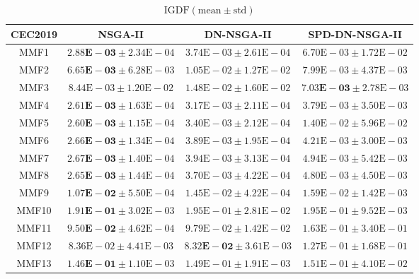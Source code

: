 \begin{table}[htbp]
	\scriptsize
	\centering
	\caption{$\text{IGDF} (\text{mean} \pm \text{std})$}\label{tab: IGDF}
	\begin{tabular}{cccc}
		\toprule
		CEC2019 & NSGA-II & DN-NSGA-II & SPD-DN-NSGA-II \\
		\midrule
		MMF1 & $\mathbf{2.88\text{E}-03} \pm 2.34\text{E}-04$ & $3.74\text{E}-03 \pm 2.61\text{E}-04$ & $6.70\text{E}-03 \pm 1.72\text{E}-02$\\
		MMF2 & $\mathbf{6.65\text{E}-03} \pm 6.28\text{E}-03$ & $1.05\text{E}-02 \pm 1.27\text{E}-02$ & $7.99\text{E}-03 \pm 4.37\text{E}-03$\\
		MMF3 & $8.44\text{E}-03 \pm 1.20\text{E}-02$ & $1.48\text{E}-02 \pm 1.60\text{E}-02$ & $\mathbf{7.03\text{E}-03} \pm 2.78\text{E}-03$\\
		MMF4 & $\mathbf{2.61\text{E}-03} \pm 1.63\text{E}-04$ & $3.17\text{E}-03 \pm 2.11\text{E}-04$ & $3.79\text{E}-03 \pm 3.50\text{E}-03$\\
		MMF5 & $\mathbf{2.60\text{E}-03} \pm 1.15\text{E}-04$ & $3.40\text{E}-03 \pm 2.12\text{E}-04$ & $1.40\text{E}-02 \pm 5.96\text{E}-02$\\
		MMF6 & $\mathbf{2.66\text{E}-03} \pm 1.34\text{E}-04$ & $3.89\text{E}-03 \pm 1.95\text{E}-04$ & $4.21\text{E}-03 \pm 3.00\text{E}-03$\\
		MMF7 & $\mathbf{2.67\text{E}-03} \pm 1.40\text{E}-04$ & $3.94\text{E}-03 \pm 3.13\text{E}-04$ & $4.94\text{E}-03 \pm 5.42\text{E}-03$\\
		MMF8 & $\mathbf{2.65\text{E}-03} \pm 1.44\text{E}-04$ & $3.70\text{E}-03 \pm 4.22\text{E}-04$ & $4.80\text{E}-03 \pm 4.50\text{E}-03$\\
		MMF9 & $\mathbf{1.07\text{E}-02} \pm 5.50\text{E}-04$ & $1.45\text{E}-02 \pm 4.22\text{E}-04$ & $1.59\text{E}-02 \pm 1.42\text{E}-03$\\
		MMF10 & $\mathbf{1.91\text{E}-01} \pm 3.02\text{E}-03$ & $1.95\text{E}-01 \pm 2.81\text{E}-02$ & $1.95\text{E}-01 \pm 9.52\text{E}-03$\\
		MMF11 & $\mathbf{9.50\text{E}-02} \pm 4.62\text{E}-04$ & $9.79\text{E}-02 \pm 1.42\text{E}-02$ & $1.63\text{E}-01 \pm 3.40\text{E}-01$\\
		MMF12 & $8.36\text{E}-02 \pm 4.41\text{E}-03$ & $\mathbf{8.32\text{E}-02} \pm 3.61\text{E}-03$ & $1.27\text{E}-01 \pm 1.68\text{E}-01$\\
		MMF13 & $\mathbf{1.46\text{E}-01} \pm 1.10\text{E}-03$ & $1.49\text{E}-01 \pm 1.91\text{E}-03$ & $1.51\text{E}-01 \pm 4.10\text{E}-02$\\

\end{tabular}
\end{table}
